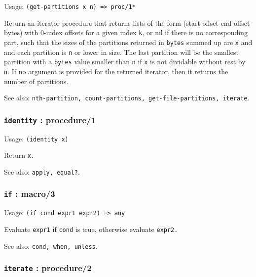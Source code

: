 \documentclass[
]{article}
\newcommand{\passthrough}[1]{#1}
\begin{document}
Usage: \passthrough{\lstinline!(get-partitions x n) => proc/1*!}

Return an iterator procedure that returns lists of the form
(start-offset end-offset bytes) with 0-index offsets for a given index
\passthrough{\lstinline!k!}, or nil if there is no corresponding part,
such that the sizes of the partitions returned in
\passthrough{\lstinline!bytes!} summed up are
\passthrough{\lstinline!x!} and and each partition is
\passthrough{\lstinline!n!} or lower in size. The last partition will be
the smallest partition with a \passthrough{\lstinline!bytes!} value
smaller than \passthrough{\lstinline!n!} if \passthrough{\lstinline!x!}
is not dividable without rest by \passthrough{\lstinline!n!}. If no
argument is provided for the returned iterator, then it returns the
number of partitions.

See also:
\passthrough{\lstinline!nth-partition, count-partitions, get-file-partitions, iterate!}.

\hypertarget{identity-procedure1}{%
\subsubsection{\texorpdfstring{\texttt{identity} :
procedure/1}{identity : procedure/1}}\label{identity-procedure1}}

Usage: \passthrough{\lstinline!(identity x)!}

Return \passthrough{\lstinline!x.!}

See also: \passthrough{\lstinline!apply, equal?!}.

\hypertarget{if-macro3}{%
\subsubsection{\texorpdfstring{\texttt{if} :
macro/3}{if : macro/3}}\label{if-macro3}}

Usage: \passthrough{\lstinline!(if cond expr1 expr2) => any!}

Evaluate \passthrough{\lstinline!expr1!} if
\passthrough{\lstinline!cond!} is true, otherwise evaluate
\passthrough{\lstinline!expr2.!}

See also: \passthrough{\lstinline!cond, when, unless!}.

\hypertarget{iterate-procedure2}{%
\subsubsection{\texorpdfstring{\texttt{iterate} :
procedure/2}{iterate : procedure/2}}\label{iterate-procedure2}}
\end{document}
